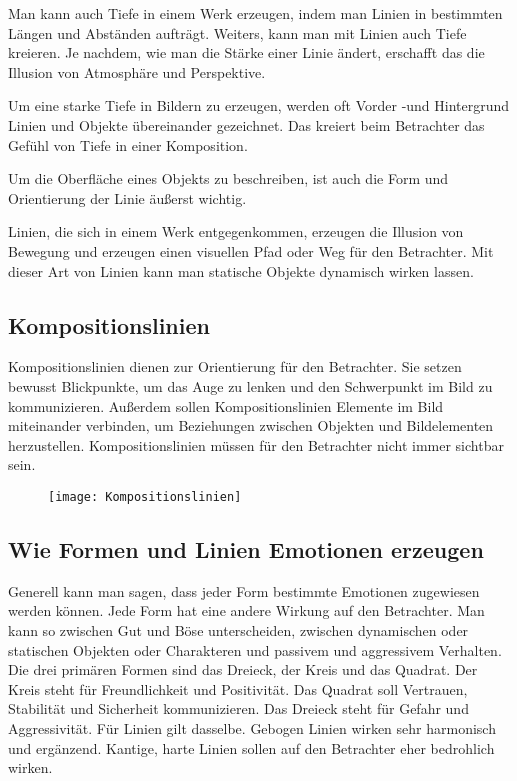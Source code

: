 Man kann auch Tiefe in einem Werk erzeugen, indem man Linien in bestimmten Längen und Abständen aufträgt. 
Weiters, kann man mit Linien auch Tiefe kreieren. Je nachdem, wie man die Stärke einer Linie ändert, erschafft das die Illusion von Atmosphäre und Perspektive. 

Um eine starke Tiefe in Bildern zu erzeugen, werden oft Vorder -und Hintergrund Linien und Objekte übereinander gezeichnet. Das kreiert beim Betrachter das Gefühl von Tiefe in einer Komposition.

Um die Oberfläche eines Objekts zu beschreiben, ist auch die Form und Orientierung der Linie äußerst wichtig. 

Linien, die sich in einem Werk entgegenkommen, erzeugen die Illusion von Bewegung und erzeugen einen visuellen Pfad oder Weg für den Betrachter. Mit dieser Art von Linien kann man statische Objekte dynamisch wirken lassen.
\cite{solarski2012drawing}

\subsection{Kompositionslinien}
Kompositionslinien dienen zur Orientierung für den Betrachter. Sie setzen bewusst Blickpunkte, um das Auge zu lenken und den Schwerpunkt im Bild zu kommunizieren. Außerdem sollen Kompositionslinien Elemente im Bild miteinander verbinden, um Beziehungen zwischen Objekten und Bildelementen herzustellen. Kompositionslinien müssen für den Betrachter nicht immer sichtbar sein. 
\cite{solarski2012drawing}

\begin{figure}[H]
	\centering
	\texttt{[image: Kompositionslinien]}
	\caption{\cite{solarski2012drawing}}
\end{figure}

\subsection{Wie Formen und Linien Emotionen erzeugen}
Generell kann man sagen, dass jeder Form bestimmte Emotionen zugewiesen werden können. Jede Form hat eine andere Wirkung auf den Betrachter. Man kann so zwischen Gut und Böse unterscheiden, zwischen dynamischen oder statischen Objekten oder Charakteren und passivem und aggressivem Verhalten. Die drei primären Formen sind das Dreieck, der Kreis und das Quadrat. Der Kreis steht für Freundlichkeit und Positivität. Das Quadrat soll Vertrauen, Stabilität und Sicherheit kommunizieren. Das Dreieck steht für Gefahr und Aggressivität. Für Linien gilt dasselbe. Gebogen Linien wirken sehr harmonisch und ergänzend. Kantige, harte Linien sollen auf den Betrachter eher bedrohlich wirken. 
\cite{solarski2012drawing}

